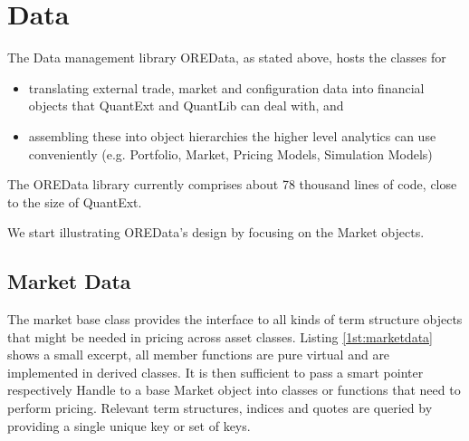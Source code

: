 \documentclass[12pt, a4paper]{article}
\begin{document}
\newpage
\section{Data}
The Data management library OREData, as stated above, hosts the classes for
\begin{itemize}
\item translating external trade, market and configuration data into financial objects that QuantExt and QuantLib can deal with, and
\item assembling these into object hierarchies the higher level analytics can use  conveniently (e.g. Portfolio, Market, Pricing Models, Simulation Models)
\end{itemize}

The OREData library currently comprises about 78 thousand lines of code, close to the size of QuantExt.

We start illustrating OREData's design by focusing on the Market objects.

\subsection{Market Data}\label{sec:marketdata}
The market base class provides the interface to all kinds of term structure objects that might be needed in pricing across asset classes. Listing \ref{1st:marketdata} shows a small excerpt, all member functions are pure virtual and are implemented in derived classes. It is then
sufficient to pass a smart pointer respectively Handle to a base Market object into classes or functions that need to perform pricing. Relevant term structures, indices and quotes are queried by providing a single unique key or set of keys.
\end{document}
